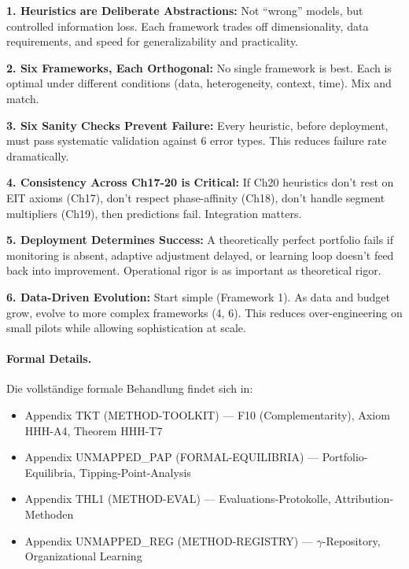 \begin{tcolorbox}[colback=green!15!white, colframe=green!85!black, title=\textbf{Ch20 Core Insights}]

\textbf{1. Heuristics are Deliberate Abstractions:} Not ``wrong'' models, but controlled information loss. Each framework trades off dimensionality, data requirements, and speed for generalizability and practicality.

\textbf{2. Six Frameworks, Each Orthogonal:} No single framework is best. Each is optimal under different conditions (data, heterogeneity, context, time). Mix and match.

\textbf{3. Six Sanity Checks Prevent Failure:} Every heuristic, before deployment, must pass systematic validation against 6 error types. This reduces failure rate dramatically.

\textbf{4. Consistency Across Ch17-20 is Critical:} If Ch20 heuristics don't rest on EIT axioms (Ch17), don't respect phase-affinity (Ch18), don't handle segment multipliers (Ch19), then predictions fail. Integration matters.

\textbf{5. Deployment Determines Success:} A theoretically perfect portfolio fails if monitoring is absent, adaptive adjustment delayed, or learning loop doesn't feed back into improvement. Operational rigor is as important as theoretical rigor.

\textbf{6. Data-Driven Evolution:} Start simple (Framework 1). As data and budget grow, evolve to more complex frameworks (4, 6). This reduces over-engineering on small pilots while allowing sophistication at scale.

\end{tcolorbox}

\paragraph{Formal Details.}
Die vollständige formale Behandlung findet sich in:
\begin{itemize}[nosep]
\item Appendix TKT (METHOD-TOOLKIT) --- F10 (Complementarity), Axiom HHH-A4, Theorem HHH-T7
\item Appendix UNMAPPED_PAP (FORMAL-EQUILIBRIA) --- Portfolio-Equilibria, Tipping-Point-Analysis
\item Appendix THL1 (METHOD-EVAL) --- Evaluations-Protokolle, Attribution-Methoden
\item Appendix UNMAPPED_REG (METHOD-REGISTRY) --- $\gamma$-Repository, Organizational Learning
\end{itemize}


